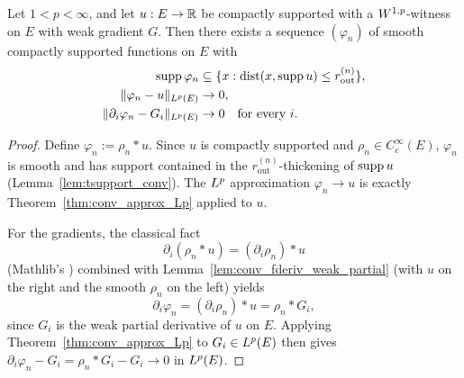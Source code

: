 \begin{theorem}
\label{thm:smooth_approx_univ}
\leanok
{}
Let $1 < p < \infty$, and let $u : E \to \mathbb{R}$ be compactly supported with a
$W^{1,p}$-witness on $E$ with weak gradient $G$. Then there exists a sequence
$(\varphi_n)$ of smooth compactly supported functions on $E$ with
\begin{align*}
  \operatorname{supp} \varphi_n &\subseteq \{x : \operatorname{dist}(x, \operatorname{supp} u) \le r_{\text{out}}^{(n)}\}, \\
  \|\varphi_n - u\|_{L^{p}(E)} &\to 0, \\
  \|\partial_i\varphi_n - G_i\|_{L^{p}(E)} &\to 0 \quad\text{for every } i.
\end{align*}
\end{theorem}

\begin{proof}
\leanok
{}

Define $\varphi_n := \rho_n * u$. Since $u$ is compactly supported and $\rho_n
\in C_c^\infty(E)$, $\varphi_n$ is smooth and has support contained in the
$r_{\text{out}}^{(n)}$-thickening of $\operatorname{supp} u$ (Lemma~\ref{lem:tsupport_conv}).
The $L^{p}$ approximation $\varphi_n \to u$ is exactly
Theorem~\ref{thm:conv_approx_Lp} applied to $u$.

For the gradients, the classical fact
\begin{equation*}
  \partial_i (\rho_n * u) = (\partial_i \rho_n) * u
\end{equation*}
(Mathlib's
)
combined with Lemma~\ref{lem:conv_fderiv_weak_partial} (with $u$ on the right
and the smooth $\rho_n$ on the left) yields
\begin{equation*}
  \partial_i \varphi_n = (\partial_i\rho_n) * u = \rho_n * G_i,
\end{equation*}
since $G_i$ is the weak partial derivative of $u$ on $E$. Applying
Theorem~\ref{thm:conv_approx_Lp} to $G_i \in L^{p}(E)$ then gives
$\partial_i\varphi_n - G_i = \rho_n * G_i - G_i \to 0$ in $L^{p}(E)$.
\end{proof}

